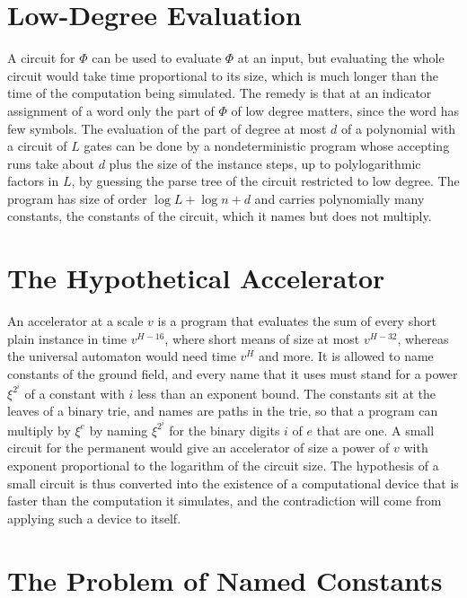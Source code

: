 \documentclass[11pt,letterpaper]{report}
\theoremstyle{plain}
\theoremstyle{definition}
\theoremstyle{remark}
\begin{document}
\section{Low-Degree Evaluation}

A circuit for $\Phi$ can be used to evaluate $\Phi$ at an input, but evaluating the whole circuit would take time proportional to its size, which is much longer than the time of the computation being simulated. The remedy is that at an indicator assignment of a word only the part of $\Phi$ of low degree matters, since the word has few symbols. The evaluation of the part of degree at most $d$ of a polynomial with a circuit of $L$ gates can be done by a nondeterministic program whose accepting runs take about $d$ plus the size of the instance steps, up to polylogarithmic factors in $L$, by guessing the parse tree of the circuit restricted to low degree. The program has size of order $\log L+\log n+d$ and carries polynomially many constants, the constants of the circuit, which it names but does not multiply.

\section{The Hypothetical Accelerator}

An accelerator at a scale $v$ is a program that evaluates the sum of every short plain instance in time $v^{H-16}$, where short means of size at most $v^{H-32}$, whereas the universal automaton would need time $v^H$ and more. It is allowed to name constants of the ground field, and every name that it uses must stand for a power $\xi^{2^i}$ of a constant with $i$ less than an exponent bound. The constants sit at the leaves of a binary trie, and names are paths in the trie, so that a program can multiply by $\xi^e$ by naming $\xi^{2^i}$ for the binary digits $i$ of $e$ that are one. A small circuit for the permanent would give an accelerator of size a power of $v$ with exponent proportional to the logarithm of the circuit size. The hypothesis of a small circuit is thus converted into the existence of a computational device that is faster than the computation it simulates, and the contradiction will come from applying such a device to itself.

\section{The Problem of Named Constants}
\end{document}
